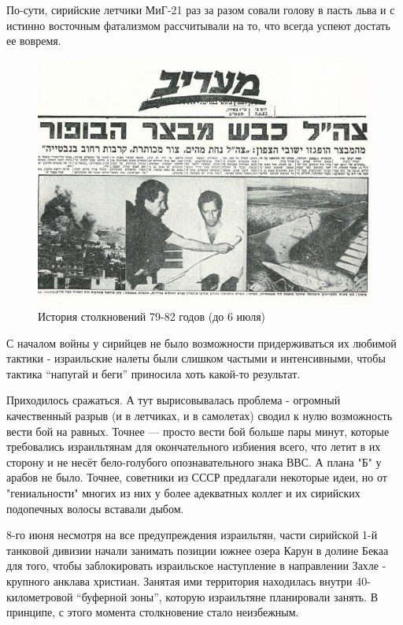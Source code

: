 По-сути, сирийские летчики МиГ-21 раз за разом совали голову в пасть льва и с истинно восточным фатализмом рассчитывали на то, что всегда успеют достать ее вовремя. 

\begin{figure}[h!tb] 
	\centering\includegraphics[scale=0.3]{Bekaa_2/LJY5OEnRwx8.jpg}
	\caption{История столкновений 79-82 годов (до 6 июля)}%
\end{figure}

С началом войны у сирийцев не было возможности придерживаться их любимой тактики - израильские налеты были слишком частыми и интенсивными, чтобы тактика “напугай и беги” приносила хоть какой-то результат.

Приходилось сражаться. А тут вырисовывалась проблема - огромный качественный разрыв (и в летчиках, и в самолетах) сводил к нулю возможность вести бой на равных. Точнее — просто вести бой больше пары минут, которые требовались израильтянам для окончательного избиения всего, что летит в их сторону и не несёт бело-голубого опознавательного знака ВВС. А плана "Б" у арабов не было. Точнее, советники из СССР предлагали некоторые идеи, но от "гениальности" многих из них у более адекватных коллег и их сирийских подопечных волосы вставали дыбом.

8-го июня несмотря на все предупреждения израильтян, части сирийской 1-й танковой дивизии начали занимать позиции южнее озера Карун в долине Бекаа для того, чтобы заблокировать израильское наступление в направлении Захле - крупного анклава христиан. Занятая ими территория находилась внутри 40-километровой “буферной зоны”, которую израильтяне планировали занять. В принципе, с этого момента столкновение стало неизбежным.

